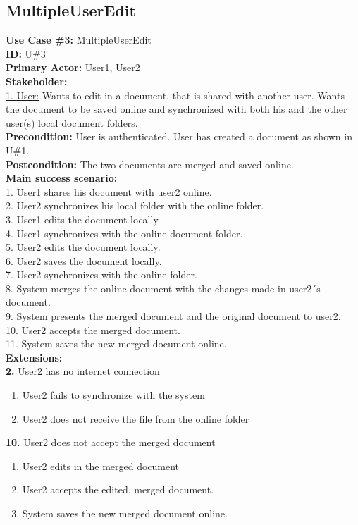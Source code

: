 \subsection{MultipleUserEdit}
\textbf{Use Case \#3:} MultipleUserEdit\\
\textbf{ID:} U\#3\\
\textbf{Primary Actor:} User1, User2\\
\textbf{Stakeholder:}\\
\underline{1. User:} Wants to edit in a document, that is shared with another user. Wants the document to be saved online and synchronized with both his and the other user(s) local document folders.\\
\newline
\textbf{Precondition:} User is authenticated. User has created a document as shown in U\#1.\\
\textbf{Postcondition:} The two documents are merged and saved online.\\
\newline
\textbf{Main success scenario:}\\
1. User1 shares his document with user2 online.\\
2. User2 synchronizes his local folder with the online folder.\\
3. User1 edits the document locally.\\
4. User1 synchronizes with the online document folder.\\
5. User2 edits the document locally.\\
6. User2 saves the document locally.\\
7. User2 synchronizes with the online folder.\\
8. System merges the online document with the changes made in user2´s document.\\
9. System presents the merged document and the original document to user2.\\
10. User2 accepts the merged document.\\
11. System saves the new merged document online.\\
\newline
\textbf{Extensions:}\\
\textbf{2.} User2 has no internet connection
\begin{enumerate}
\item User2 fails to synchronize with the system
\item User2 does not receive the file from the online folder
\end{enumerate}
\textbf{10.} User2 does not accept the merged document
\begin{enumerate}
\item User2 edits in the merged document
\item User2 accepts the edited, merged document.
\item System saves the new merged document online.
\end{enumerate}

